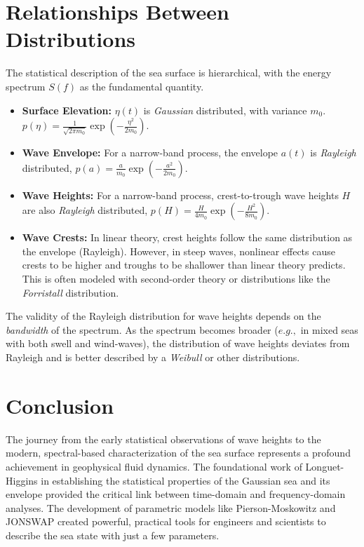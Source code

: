 \documentclass[12pt]{article}
\begin{document}
\section{Relationships Between Distributions}
The statistical description of the sea surface is hierarchical, with the energy spectrum $S(f)$ as the fundamental quantity.
\begin{itemize}
    \item \textbf{Surface Elevation:} $\eta(t)$ is \textit{Gaussian} distributed, with variance $m_0$. $p(\eta) = \frac{1}{\sqrt{2\pi m_0}} \exp\left( -\frac{\eta^2}{2m_0} \right)$.
    \item \textbf{Wave Envelope:} For a narrow-band process, the envelope $a(t)$ is \textit{Rayleigh} distributed, $p(a) = \frac{a}{m_0} \exp\left( -\frac{a^2}{2m_0} \right)$.
    \item \textbf{Wave Heights:} For a narrow-band process, crest-to-trough wave heights $H$ are also \textit{Rayleigh} distributed, $p(H) = \frac{H}{4m_0} \exp\left( -\frac{H^2}{8m_0} \right)$.
    \item \textbf{Wave Crests:} In linear theory, crest heights follow the same distribution as the envelope (Rayleigh). However, in steep waves, nonlinear effects cause crests to be higher and troughs to be shallower than linear theory predicts. This is often modeled with second-order theory or distributions like the \textit{Forristall} distribution.
\end{itemize}
The validity of the Rayleigh distribution for wave heights depends on the \textit{bandwidth} of the spectrum. As the spectrum becomes broader ($e.g.,$ in mixed seas with both swell and wind-waves), the distribution of wave heights deviates from Rayleigh and is better described by a \textit{Weibull} or other distributions.

\section{Conclusion}
The journey from the early statistical observations of wave heights to the modern, spectral-based characterization of the sea surface represents a profound achievement in geophysical fluid dynamics. The foundational work of Longuet-Higgins in establishing the statistical properties of the Gaussian sea and its envelope provided the critical link between time-domain and frequency-domain analyses. The development of parametric models like Pierson-Moskowitz and JONSWAP created powerful, practical tools for engineers and scientists to describe the sea state with just a few parameters.
\end{document}
